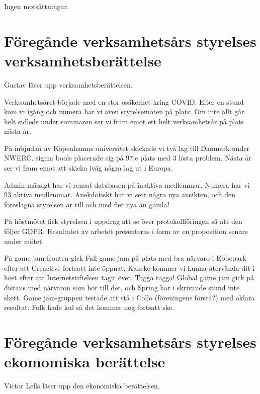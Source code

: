 \documentclass[a4paper]{article}
\newenvironment{quotationb}%
{\begin{leftbar}}%
{\end{leftbar}}
\begin{document}
Ingen motsättningar.

\section{Föregånde verksamhetsårs styrelses verksamhetsberättelse}

Gustav läser upp verksamhetsberättelsen.

\begin{quotationb}

Verksamhetsåret började med en stor osäkerhet kring COVID. Efter en stund kom vi
    igång och numera har vi även styrelsemöten på plats. Om inte allt går helt
    sidleds under sommaren ser vi fram emot ett helt verksamhetsår på plats
    nästa år.

På inbjudan av Köpenhamns universitet skickade vi två lag till Danmark under
    NWERC. sigma bools placerade sig på 97:e plats med 3 lösta problem. Nästa år
    ser vi fram emot att skicka iväg några lag ut i Europa.

Admin-mässigt har vi rensat databasen på inaktiva medlemmar. Numera har vi 93
    aktiva medlemmar. Anekdotiskt har vi sett några nya ansikten, och den
    föreslagna styrelsen är till och med fler nya än gamla!

På höstmötet fick styrelsen i uppdrag att se över protokollföringen så att den
    följer GDPR. Resultatet av arbetet presenteras i form av en proposition
    senare under mötet.

På game jam-fronten gick Fall game jam på plats med bra närvaro i Ebbepark efter
    att Creactive fortsatt inte öppnat. Kanske kommer vi kunna återvända dit i
    höst efter att Internetstiftelsen tagit över. Tagga tagga! Global game jam
    gick på distans med närvaron som hör till det, och Spring har i skrivande
    stund inte skett. Game jam-gruppen testade att stå i Collo (föreningens
    första?) med oklara resultat. Folk hade kul så det kommer nog fortsatt ske.

\end{quotationb}

\section{Föregånde verksamhetsårs styrelses ekomomiska berättelse}

Victor Lells läser upp den ekonomiska berättelsen.
\end{document}
